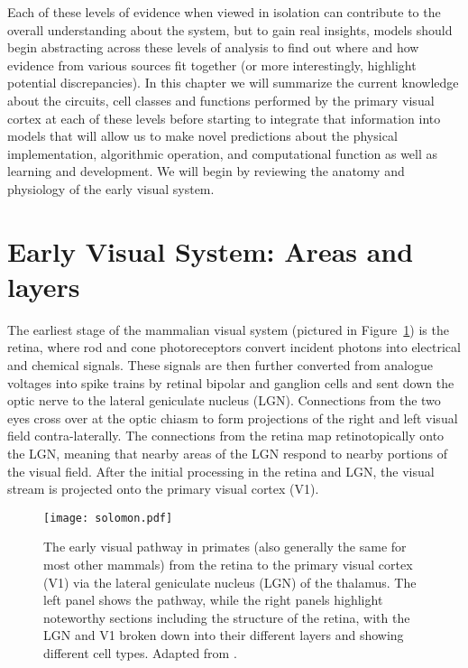 Each of these levels of evidence when viewed in isolation can
contribute to the overall understanding about the system, but to gain
real insights, models should begin abstracting across these levels of
analysis to find out where and how evidence from various sources fit
together (or more interestingly, highlight potential
discrepancies). In this chapter we will summarize the current
knowledge about the circuits, cell classes and functions performed by
the primary visual cortex at each of these levels before starting to
integrate that information into models that will allow us to make
novel predictions about the physical implementation, algorithmic
operation, and computational function as well as learning and
development.  We will begin by reviewing the anatomy and physiology of
the early visual system.

\section{Early Visual System: Areas and layers}

The earliest stage of the mammalian visual system (pictured in
Figure~\ref{VisualSystem}) is the retina, where rod and cone
photoreceptors convert incident photons into electrical and chemical
signals. These signals are then further converted from analogue
voltages into spike trains by retinal bipolar and ganglion cells and
sent down the optic nerve to the lateral geniculate nucleus
(LGN). Connections from the two eyes cross over at the optic chiasm to
form projections of the right and left visual field
contra-laterally. The connections from the retina map retinotopically
onto the LGN, meaning that nearby areas of the LGN respond to nearby
portions of the visual field. After the initial processing in the
retina and LGN, the visual stream is projected onto the primary visual
cortex (V1).

\begin{figure}
	\centering
        \texttt{[image: solomon.pdf]}
	\caption[A diagram of the early visual pathway in mammals, reproduced
      from \cite{Solomon2007}.]{The early visual pathway in primates
      (also generally the same for most other mammals) from
      the retina to the primary visual cortex (V1) via the lateral
      geniculate nucleus (LGN) of the thalamus. The left panel shows
      the pathway, while the right panels highlight noteworthy
      sections including the structure of the retina, with the LGN and V1
      broken down into their different layers and showing different
      cell types. Adapted from \cite{Solomon2007}.}
	\label{VisualSystem}
\end{figure}

